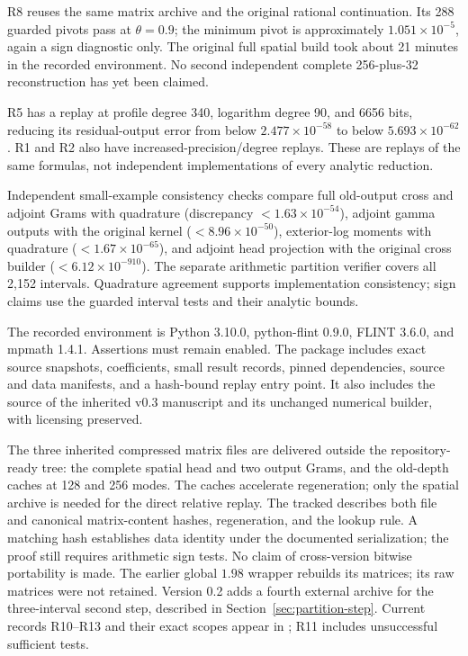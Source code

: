 \documentclass[11pt]{article}
\theoremstyle{remark}\newtheorem{remark}[theorem]{Remark}
\newcommand{\rec}[1]{\texttt{\detokenize{#1}}}
\begin{document}
R8 reuses the same matrix archive and the original rational continuation. Its 288 guarded pivots pass at $\theta=0.9$; the minimum pivot is approximately $1.051\times10^{-5}$, again a sign diagnostic only. The original full spatial build took about 21 minutes in the recorded environment. No second independent complete 256-plus-32 reconstruction has yet been claimed.

R5 has a replay at profile degree 340, logarithm degree 90, and 6656 bits, reducing its residual-output error from below $2.477\times10^{-58}$ to below $5.693\times10^{-62}$. R1 and R2 also have increased-precision/degree replays. These are replays of the same formulas, not independent implementations of every analytic reduction.

Independent small-example consistency checks compare full old-output cross and adjoint Grams with quadrature (discrepancy $<1.63\times10^{-54}$), adjoint gamma outputs with the original kernel ($<8.96\times10^{-50}$), exterior-log moments with quadrature ($<1.67\times10^{-65}$), and adjoint head projection with the original cross builder ($<6.12\times10^{-910}$). The separate arithmetic partition verifier covers all 2,152 intervals. Quadrature agreement supports implementation consistency; sign claims use the guarded interval tests and their analytic bounds.

The recorded environment is Python 3.10.0, python-flint 0.9.0, FLINT 3.6.0, and mpmath 1.4.1. Assertions must remain enabled. The package includes exact source snapshots, coefficients, small result records, pinned dependencies, source and data manifests, and a hash-bound replay entry point. It also includes the source of the inherited v0.3 manuscript and its unchanged numerical builder, with licensing preserved.

The three inherited compressed matrix files are delivered outside the repository-ready tree: the complete spatial head and two output Grams, and the old-depth caches at 128 and 256 modes. The caches accelerate regeneration; only the spatial archive is needed for the direct relative replay. The tracked \rec{ARCHIVES.md} describes both file and canonical matrix-content hashes, regeneration, and the \rec{STORAGE_DEPTH_ARCHIVES} lookup rule. A matching hash establishes data identity under the documented serialization; the proof still requires arithmetic sign tests. No claim of cross-version bitwise portability is made. The earlier global $1.98$ wrapper rebuilds its matrices; its raw matrices were not retained. Version 0.2 adds a fourth external archive for the three-interval second step, described in Section~\ref{sec:partition-step}. Current records R10--R13 and their exact scopes appear in \rec{CLAIMS.json}; R11 includes unsuccessful sufficient tests.
\end{document}
